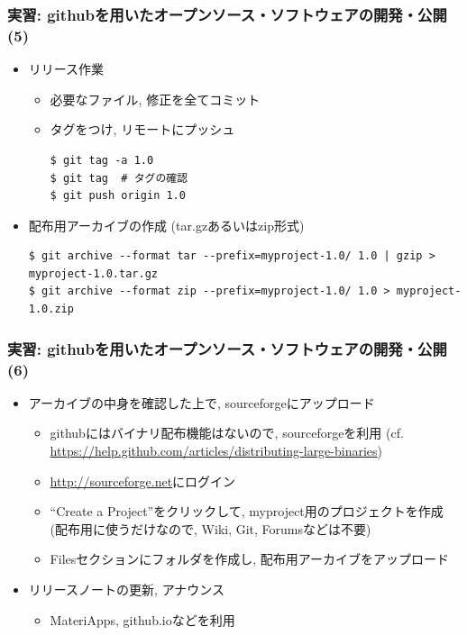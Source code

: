 \begin{frame}[t,fragile]
  \frametitle{実習: githubを用いたオープンソース・ソフトウェアの開発・公開(5)}
  \begin{itemize}
  \item リリース作業
    \begin{itemize}
    \item 必要なファイル, 修正を全てコミット
    \item タグをつけ, リモートにプッシュ
\begin{lstlisting}
$ git tag -a 1.0
$ git tag  # タグの確認
$ git push origin 1.0
\end{lstlisting}
    \end{itemize}
  \item 配布用アーカイブの作成 (tar.gzあるいはzip形式)
\begin{lstlisting}
$ git archive --format tar --prefix=myproject-1.0/ 1.0 | gzip > myproject-1.0.tar.gz
$ git archive --format zip --prefix=myproject-1.0/ 1.0 > myproject-1.0.zip
\end{lstlisting}
  \end{itemize}
\end{frame}

\begin{frame}[t,fragile]
  \frametitle{実習: githubを用いたオープンソース・ソフトウェアの開発・公開(6)}
  \begin{itemize}
    \setlength{\itemsep}{1em}
  \item アーカイブの中身を確認した上で, sourceforgeにアップロード
    \begin{itemize}
    \item githubにはバイナリ配布機能はないので, sourceforgeを利用 (cf. \url{https://help.github.com/articles/distributing-large-binaries})
    \item \url{http://sourceforge.net}にログイン
    \item ``Create a Project''をクリックして, myproject用のプロジェクトを作成 (配布用に使うだけなので, Wiki, Git, Forumsなどは不要)
    \item Filesセクションにフォルダを作成し, 配布用アーカイブをアップロード
    \end{itemize}
  \item リリースノートの更新, アナウンス
    \begin{itemize}
    \item MateriApps, github.ioなどを利用
    \end{itemize}
  \end{itemize}
\end{frame}

